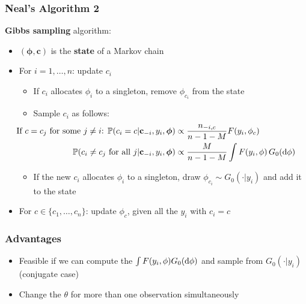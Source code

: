 \begin{frame} %
	\frametitle{Neal's Algorithm 2}
	\textbf{Gibbs sampling} algorithm:
	\begin{itemize}
		\item $(\boldsymbol\phi, \mathbf c)$ is the \textbf{state} of a Markov chain
	    \item For $i= 1,\dots,n$: update $c_{i}$
	    \begin{itemize}
	        \item If $c_{i}$ allocates $\phi_i$ to a singleton, remove $\phi_{c_{i}}$ from the state
		    \item Sample $c_i$ as follows:
	        \begin{align*}
		        \hspace{-35pt}
                \text{If $c=c_j$ for some $j\neq i$: } \PP(c_{i}=c | \mathbf c_{-i}, y_{i},\boldsymbol\phi) &\propto \frac{n_{-i,c}}{n-1-M} F(y_{i},\phi_{c}) \\
                \PP(c_{i}\neq c_{j} \text{ for all } j | \mathbf c_{-i}, y_{i},\boldsymbol\phi) &\propto \frac{M }{n-1-M} \int F(y_{i},\phi) \, G_0(\de\phi)
            \end{align*}
            \item If the new $c_{i}$ allocates $\phi_i$ to a singleton, draw $\phi_{c_{i}} \sim G_0(\cdot|y_i)$ and add it to the state
        \end{itemize} 
        
       	\item For $c \in \{c_{1},\dots,c_{n}\}$: update $\phi_{c}$, given all the $y_{i}$ with $c_{i}=c$
	\end{itemize}
		
\end{frame}


\begin{frame}
	\frametitle{Advantages}
	\begin{itemize}
	    \item Feasible if we can compute the $\int F(y_i,\phi) G_0(\mathrm d\phi)$ and sample from $G_0(\cdot|y_i)$ (conjugate case)
	    \item Change the $\theta$ for more than one observation simultaneously
	\end{itemize}
\end{frame}


